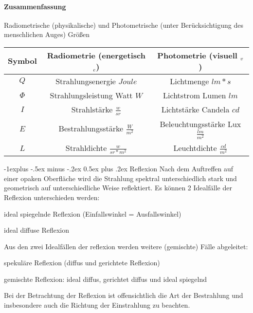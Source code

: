 \documentclass[landscape]{article}
\makeatletter
\renewcommand{\subsection}{\@startsection{subsection}{2}{0mm}%
                                {-1explus -.5ex minus -.2ex}%
                                {0.5ex plus .2ex}%
                                {\normalfont\normalsize\bfseries}}
\makeatother
\begin{document}
\begin{multicols}{3}
  \paragraph{Zusammenfassung}
  Radiometrische (physikalische) und Photometrische (unter Berücksichtigung des menschlichen Auges) Größen
  
  \begin{tabular}{ c | c | c }
    Symbol & Radiometrie (energetisch $_e$)     & Photometrie (visuell $_v$ )             \\ \hline
    $Q$    & Strahlungsenergie $Joule$          & Lichtmenge $lm*s$                       \\
    $\Phi$ & Strahlungsleistung Watt $W$        & Lichtstrom Lumen $lm$                   \\
    $I$    & Strahlstärke $\frac{w}{sr}$        & Lichtstärke Candela $cd$                \\
    $E$    & Bestrahlungsstärke $\frac{W}{m^2}$ & Beleuchtungsstärke Lux $\frac{lm}{m^2}$ \\
    $L$    & Strahldichte $\frac{w}{sr*m^2}$    & Leuchtdichte $\frac{cd}{m^2}$           \\
  \end{tabular}
  
  
  \subsection{ Reflexion}
  Nach dem Auftreffen auf einer opaken Oberfläche wird die Strahlung spektral
  unterschiedlich stark und geometrisch auf unterschiedliche Weise reflektiert. Es
  können 2 Idealfälle der Reflexion unterschieden werden:
  \begin{itemize*}
    \item ideal spiegelnde Reflexion (Einfallswinkel = Ausfallswinkel)
    \item ideal diffuse Reflexion
  \end{itemize*}
  
  Aus den zwei Idealfällen der reflexion werden weitere (gemischte) Fälle abgeleitet:
  \begin{itemize*}
    \item spekuläre Reflexion (diffus und gerichtete Reflexion)
    \item gemischte Reflexion: ideal diffus, gerichtet diffus und ideal spiegelnd
  \end{itemize*}
  
  Bei der Betrachtung der Reflexion ist offensichtlich die Art der Bestrahlung und
  insbesondere auch die Richtung der Einstrahlung zu beachten.
  

\end{multicols}
\end{document}
